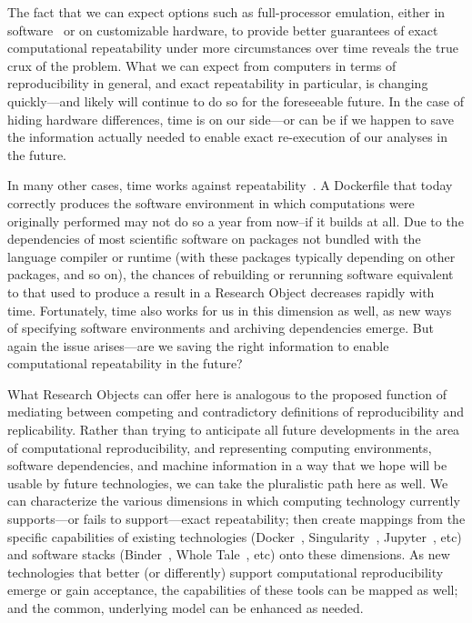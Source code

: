The fact that we can expect options such as full-processor emulation, either in software~\cite{QEMU}
	or on customizable hardware,
	to provide better guarantees of exact computational repeatability under more circumstances
	over time reveals the true crux of the problem.
What we can expect from computers in terms of reproducibility in general, and exact
	repeatability in particular, is changing quickly---and likely will continue to do so for the
	foreseeable future.
In the case of hiding hardware differences, time is on our side---or can be if we happen to save the
	information actually needed to enable exact re-execution of our analyses in the future.

In many other cases, time works against repeatability~\cite{hinsen_dealing_2019}.
A Dockerfile that today correctly produces the software environment in which computations were originally
	performed may not do so a year from now--if it builds at all.
Due to the dependencies of most scientific software on packages not
	bundled with the language compiler or runtime (with these packages typically depending on
	other packages, and so on), the chances of rebuilding or rerunning software
	equivalent to that used to produce a result in a Research Object decreases
	rapidly with time.
Fortunately, time also works for us in this dimension as well, as new ways of specifying software
	environments and archiving dependencies emerge.
But again the issue arises---are we saving the right information to enable computational repeatability
	in the future?

What Research Objects can offer here is analogous to the proposed function of mediating between competing
	and contradictory definitions of reproducibility and replicability.
Rather than trying to anticipate all future developments in the area of computational reproducibility,
	and representing computing environments, software dependencies, and machine information
	in a way that we hope will be usable by future technologies, we can take the pluralistic
	path here as well.
We can characterize the various dimensions in which computing technology currently supports---or fails to
	support---exact repeatability; then create mappings from the specific capabilities
	of existing technologies (Docker~\cite{docker2019}, Singularity~\cite{Singularity2019}, Jupyter~\cite{jupyter2019}, etc)
	and software stacks (Binder~\cite{Binder_2018}, Whole Tale~\cite{WT2019}, etc)
	onto these dimensions.
As new technologies that better (or differently) support computational reproducibility emerge or gain acceptance,
	the capabilities of these tools can be mapped as well; and the common, underlying model can be enhanced as needed.

